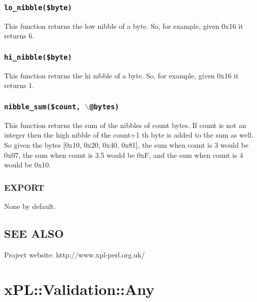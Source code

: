 \subsubsection*{\texttt{lo\_nibble(\$byte)}\label{xPL::Utils_lo_nibble_byte_}}


This function returns the low nibble of a byte.  So, for example, given
0x16 it returns 6.

\subsubsection*{\texttt{hi\_nibble(\$byte)}\label{xPL::Utils_hi_nibble_byte_}}


This function returns the hi nibble of a byte.  So, for example, given
0x16 it returns 1.

\subsubsection*{\texttt{nibble\_sum(\$count, $\backslash$@bytes)}\label{xPL::Utils_nibble_sum_count_backslash_bytes_}}


This function returns the sum of the nibbles of count bytes.  If count
is not an integer then the high nibble of the count+1 th byte is added
to the sum as well.  So given the bytes [0x10, 0x20, 0x40, 0x81], the
sum when count is 3 would be 0x07, the sum when count is 3.5 would be
0xF, and the sum when count is 4 would be 0x10.

\subsubsection*{EXPORT\label{xPL::Utils_EXPORT}}


None by default.

\subsection*{SEE ALSO\label{xPL::Utils_SEE_ALSO}}


Project website: http://www.xpl-perl.org.uk/

\section{xPL::Validation::Any\label{xPL::Validation::Any}}


